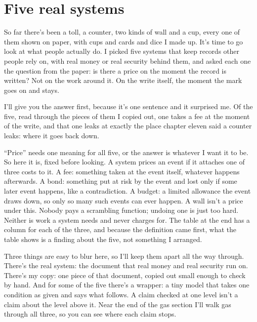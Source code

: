 \documentclass[11pt,twoside]{article}
\theoremstyle{thielethm}
\theoremstyle{thieledef}
\theoremstyle{thieledef}
\theoremstyle{thieledef}
\theoremstyle{thielethm}
\theoremstyle{thieleobs}
\theoremstyle{thielethm}
\begin{document}
\section{Five real systems}
\label{sec:five-systems}

So far there's been a toll, a counter, two kinds of wall and a cup, every one of them shown on paper, with cups and cards and dice I made up. It's time to go look at what people actually do. I picked five systems that keep records other people rely on, with real money or real security behind them, and asked each one the question from the paper: is there a price on the moment the record is written? Not on the work around it. On the write itself, the moment the mark goes on and stays.

I'll give you the answer first, because it's one sentence and it surprised me. Of the five, read through the pieces of them I copied out, one takes a fee at the moment of the write, and that one leaks at exactly the place chapter eleven said a counter leaks: where it goes back down.

``Price'' needs one meaning for all five, or the answer is whatever I want it to be. So here it is, fixed before looking. A system prices an event if it attaches one of three costs to it. A fee: something taken at the event itself, whatever happens afterwards. A bond: something put at risk by the event and lost only if some later event happens, like a contradiction. A budget: a limited allowance the event draws down, so only so many such events can ever happen. A wall isn't a price under this. Nobody pays a scrambling function; undoing one is just too hard. Neither is work a system needs and never charges for. The table at the end has a column for each of the three, and because the definition came first, what the table shows is a finding about the five, not something I arranged.

Three things are easy to blur here, so I'll keep them apart all the way through. There's the real system: the document that real money and real security run on. There's my copy: one piece of that document, copied out small enough to check by hand. And for some of the five there's a wrapper: a tiny model that takes one condition as given and says what follows. A claim checked at one level isn't a claim about the level above it. Near the end of the gas section I'll walk gas through all three, so you can see where each claim stops.
\end{document}
